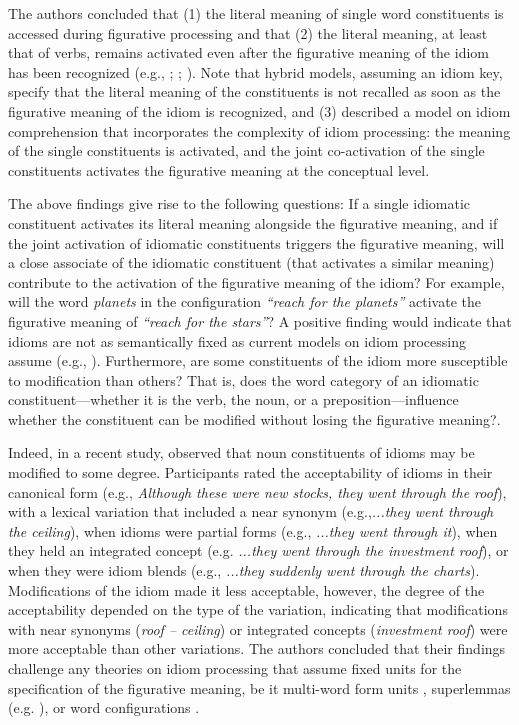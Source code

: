 The authors concluded that (1) the literal meaning of single word constituents is accessed during figurative processing and that (2) the literal meaning, at least that of verbs, remains activated even after the figurative meaning of the idiom has been recognized (e.g., \citealt{cacciari:1988}; \citealt{cutting:1997}; \citealt{sprenger:2006}). Note that hybrid models, assuming an idiom key, specify that the literal meaning of the constituents is not recalled as soon as the figurative meaning of the idiom is recognized, and (3) described a model on idiom comprehension that incorporates the complexity of idiom processing: the meaning of the single constituents is activated, and the joint co-activation of the single constituents activates the figurative meaning at the conceptual level.

The above findings give rise to the following questions: If a single idiomatic constituent activates its literal meaning alongside the figurative meaning, and if the joint activation of idiomatic constituents triggers the figurative meaning, will a close associate of the idiomatic constituent (that activates a similar meaning) contribute to the activation of the figurative meaning of the idiom? For example, will the word \textit{planets} in the configuration \textit{``reach for the planets''} activate the figurative meaning of \textit{``reach for the stars''}? A positive finding would indicate that idioms are not as semantically fixed as current models on idiom processing assume (e.g., \citealt{sprenger:2006}). Furthermore, are some constituents of the idiom more susceptible to modification than others? That is, does the word category of an idiomatic constituent—whether it is the verb, the noun, or a preposition—influence whether the constituent can be modified without losing the figurative meaning?.

Indeed, in a recent study, \citealt{geeraert:2017} observed that noun constituents of idioms may be modified to some degree.  Participants rated the acceptability of idioms in their canonical form (e.g., \textit{Although these were new stocks, they went through the roof}), with a lexical variation that included a near synonym (e.g.,\textit{...they went through the ceiling}), when idioms were partial forms (e.g., \textit{...they went through it}), when they held an integrated concept (e.g. \textit{...they went through the investment roof}), or when they were idiom blends (e.g., \textit{...they suddenly went through the charts}). Modifications of the idiom made it less acceptable, however, the degree of the acceptability depended on the type of the variation, indicating that modifications with near synonyms (\textit{roof – ceiling}) or integrated concepts (\textit{investment roof}) were more acceptable than other variations. The authors concluded that their findings challenge any theories on idiom processing that assume fixed units for the specification of the figurative meaning, be it multi-word form units \citep{bobrow:1973}, superlemmas (e.g. \citealt{sprenger:2006}), or word configurations \citep{cacciari:1988}. 

